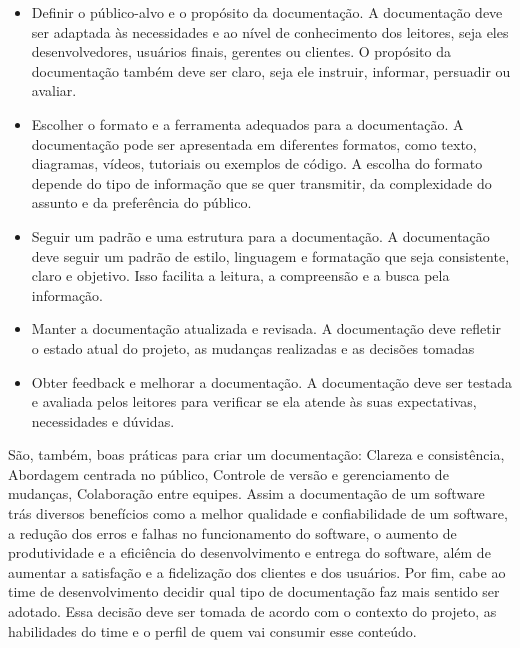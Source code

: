 \documentclass[12pt,oneside,a4paper,article]{abntex2}
\begin{document}
\begin{itemize}
      \item Definir o público-alvo e o propósito da documentação. A documentação deve ser adaptada às
            necessidades e ao nível de conhecimento dos leitores, seja eles desenvolvedores, usuários finais,
            gerentes ou clientes. O propósito da documentação também deve ser claro, seja ele instruir,
            informar, persuadir ou avaliar.
      \item Escolher o formato e a ferramenta adequados para a documentação. A documentação pode ser
            apresentada em diferentes formatos, como texto, diagramas, vídeos, tutoriais ou exemplos de
            código. A escolha do formato depende do tipo de informação que se quer transmitir, da
            complexidade do assunto e da preferência do público.
      \item Seguir um padrão e uma estrutura para a documentação. A documentação deve seguir um padrão
            de estilo, linguagem e formatação que seja consistente, claro e objetivo. Isso facilita a leitura, a
            compreensão e a busca pela informação.
      \item Manter a documentação atualizada e revisada. A documentação deve refletir o estado atual do
            projeto, as mudanças realizadas e as decisões tomadas
      \item Obter feedback e melhorar a documentação. A documentação deve ser testada e avaliada pelos
            leitores para verificar se ela atende às suas expectativas, necessidades e dúvidas.

\end{itemize}
São, também, boas práticas para criar um documentação: Clareza e consistência, Abordagem centrada no público, Controle de versão e gerenciamento de mudanças, Colaboração entre equipes.
Assim a documentação de um software trás diversos benefícios como a melhor qualidade e confiabilidade de um software, a redução dos erros e falhas no funcionamento do software, o aumento de produtividade e a eficiência do desenvolvimento e entrega do software, além de aumentar a satisfação e a fidelização dos clientes e dos usuários. Por fim, cabe ao time de desenvolvimento decidir qual tipo de documentação faz mais sentido ser adotado. Essa decisão deve ser tomada de acordo com o contexto do projeto, as habilidades do time e o perfil de quem vai
consumir esse conteúdo.
\end{document}
